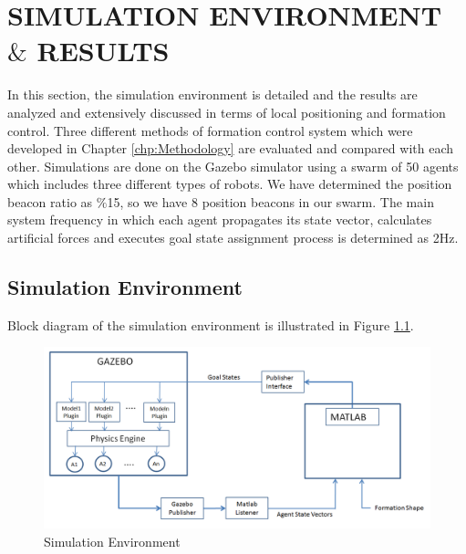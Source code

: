 

\chapter{SIMULATION ENVIRONMENT $\&$ RESULTS}
\label{chp:simulation}













In this section, the simulation environment is detailed and the results are analyzed and extensively discussed in terms of local positioning and formation control. Three different methods of formation control system which were developed in Chapter \ref{chp:Methodology} are evaluated and compared with each other. Simulations are done on the Gazebo simulator using a swarm of 50 agents which includes three different types of robots. We have determined the position beacon ratio as $\%$15, so we have 8 position beacons in our swarm. The main system frequency in which each agent propagates its state vector, calculates artificial forces and executes goal state assignment process is determined as 2Hz. 

\newpage
\section{Simulation Environment}
Block diagram of the simulation environment is illustrated in Figure \ref{simulation_env_ref}.

\begin{figure}[H]
\caption{Simulation Environment} \label{simulation_env_ref}
\centering
\includegraphics[scale = 0.45]{environment}
\end{figure}
    

